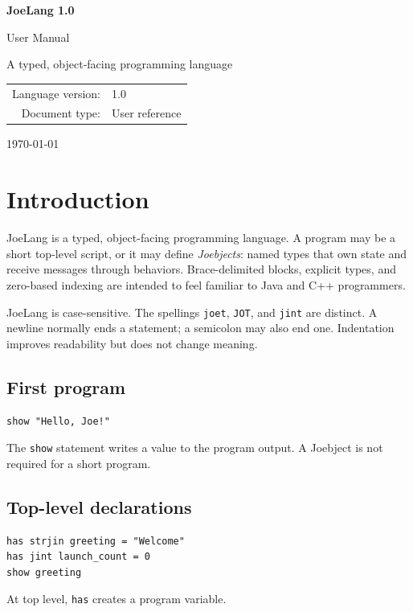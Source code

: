 \documentclass[11pt]{article}
\newcommand{\keyword}[1]{\texttt{#1}}
\begin{document}
\begin{titlepage}
\centering
\vspace*{1.6in}
{\Huge\bfseries JoeLang 1.0\par}
\vspace{0.25in}
{\Large User Manual\par}
\vspace{0.45in}
{\large A typed, object-facing programming language\par}
\vfill
\begin{tabular}{rl}
Language version: & 1.0 \\
Document type: & User reference \\
\end{tabular}
\vfill
{\large \today\par}
\end{titlepage}
\tableofcontents
\newpage
\section{Introduction}
JoeLang is a typed, object-facing programming language. A program may be a short top-level script, or it may define \emph{Joebjects}: named types that own state and receive messages through behaviors. Brace-delimited blocks, explicit types, and zero-based indexing are intended to feel familiar to Java and C++ programmers.

JoeLang is case-sensitive. The spellings \keyword{joet}, \keyword{JOT}, and \keyword{jint} are distinct. A newline normally ends a statement; a semicolon may also end one. Indentation improves readability but does not change meaning.

\subsection{First program}
\begin{lstlisting}
show "Hello, Joe!"
\end{lstlisting}
The \keyword{show} statement writes a value to the program output. A Joebject is not required for a short program.

\subsection{Top-level declarations}
\begin{lstlisting}
has strjin greeting = "Welcome"
has jint launch_count = 0
show greeting
\end{lstlisting}
At top level, \keyword{has} creates a program variable.
\end{document}
